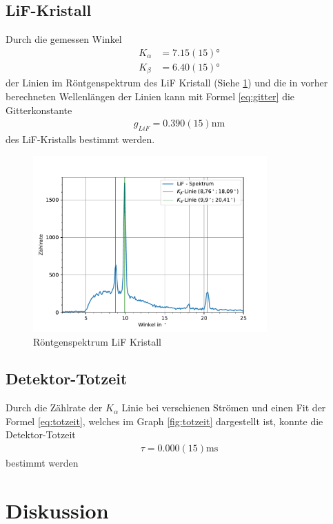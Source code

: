 \documentclass[11pt, a4paper]{article}
\begin{document}
    \subsection{LiF-Kristall}
    Durch die gemessen Winkel
    \begin{align}
        K_{\alpha} &= 7.15(15) \si{\degree} \\
        K_{\beta} &= 6.40(15) \si{\degree}
    \end{align}
    der Linien im Röntgenspektrum des LiF Kristall (Siehe \ref{fig:LiF}) und die in vorher berechneten Wellenlängen der Linien kann mit Formel \ref{eq:gitter} die Gitterkonstante
    \begin{align}
        g_{LiF} = 0.390(15) \si{\nano\meter}
    \end{align}
    des LiF-Kristalls bestimmt werden.

    \begin{figure}
        \centering
        \includegraphics[width=0.8\textwidth]{LiF-Spektrum.pdf}
        \caption{Röntgenspektrum LiF Kristall}
        \label{fig:LiF}
    \end{figure}

    \subsection{Detektor-Totzeit}
    Durch die Zählrate der $K_{\alpha}$ Linie bei verschienen Strömen und einen Fit der Formel \ref{eq:totzeit}, welches im Graph \ref{fig:totzeit} dargestellt ist, konnte die Detektor-Totzeit
    \begin{align}
        \tau = 0.000(15) \si{\milli\second}
    \end{align}
    bestimmt werden

    \section{Diskussion}

    
    
\end{document}
